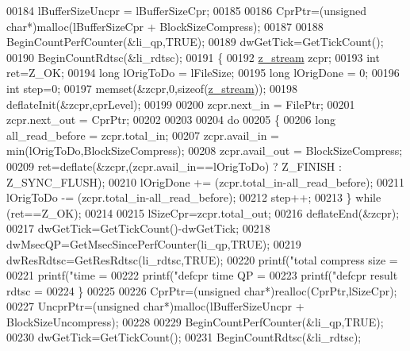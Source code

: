 \begin{DoxyCode}
{{{{00184     lBufferSizeUncpr = lBufferSizeCpr;
00185 
00186     CprPtr=(\textcolor{keywordtype}{unsigned} \textcolor{keywordtype}{char}*)malloc(lBufferSizeCpr + BlockSizeCompress);
00187 
00188     BeginCountPerfCounter(&li\_qp,TRUE);
00189     dwGetTick=GetTickCount();
00190     BeginCountRdtsc(&li\_rdtsc);
00191     \{
00192         \hyperlink{structz__stream__s}{z\_stream} zcpr;
00193         \textcolor{keywordtype}{int} ret=Z\_OK;
00194         \textcolor{keywordtype}{long} lOrigToDo = lFileSize;
00195         \textcolor{keywordtype}{long} lOrigDone = 0;
00196         \textcolor{keywordtype}{int} step=0;
00197         memset(&zcpr,0,\textcolor{keyword}{sizeof}(\hyperlink{structz__stream__s}{z\_stream}));
00198         deflateInit(&zcpr,cprLevel);
00199 
00200         zcpr.next\_in = FilePtr;
00201         zcpr.next\_out = CprPtr;
00202 
00203 
00204         \textcolor{keywordflow}{do}
00205         \{
00206             \textcolor{keywordtype}{long} all\_read\_before = zcpr.total\_in;
00207             zcpr.avail\_in = min(lOrigToDo,BlockSizeCompress);
00208             zcpr.avail\_out = BlockSizeCompress;
00209             ret=deflate(&zcpr,(zcpr.avail\_in==lOrigToDo) ? Z\_FINISH : Z\_SYNC\_FLUSH);
00210             lOrigDone += (zcpr.total\_in-all\_read\_before);
00211             lOrigToDo -= (zcpr.total\_in-all\_read\_before);
00212             step++;
00213         \} \textcolor{keywordflow}{while} (ret==Z\_OK);
00214 
00215         lSizeCpr=zcpr.total\_out;
00216         deflateEnd(&zcpr);
00217         dwGetTick=GetTickCount()-dwGetTick;
00218         dwMsecQP=GetMsecSincePerfCounter(li\_qp,TRUE);
00219         dwResRdtsc=GetResRdtsc(li\_rdtsc,TRUE);
00220         printf(\textcolor{stringliteral}{"total compress size = %
00221         printf(\textcolor{stringliteral}{"time = %
00222         printf(\textcolor{stringliteral}{"defcpr time QP = %
00223         printf(\textcolor{stringliteral}{"defcpr result rdtsc = %
00224     \}
00225 
00226     CprPtr=(\textcolor{keywordtype}{unsigned} \textcolor{keywordtype}{char}*)realloc(CprPtr,lSizeCpr);
00227     UncprPtr=(\textcolor{keywordtype}{unsigned} \textcolor{keywordtype}{char}*)malloc(lBufferSizeUncpr + BlockSizeUncompress);
00228 
00229     BeginCountPerfCounter(&li\_qp,TRUE);
00230     dwGetTick=GetTickCount();
00231     BeginCountRdtsc(&li\_rdtsc);
}}}}}}}}
\end{DoxyCode}
